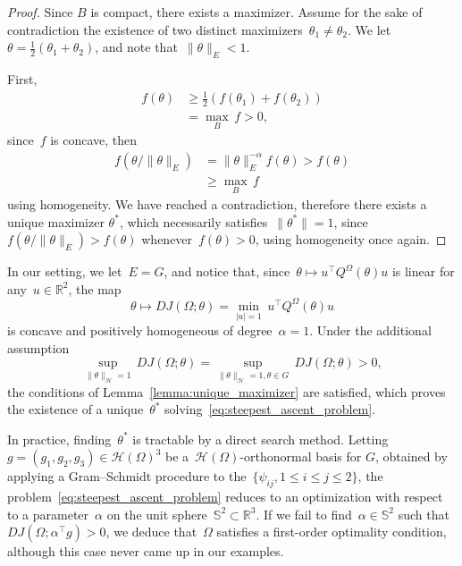 \documentclass[a4]{article}
\newcommand{\R}{\mathbb{R}}
\newcommand{\1}{\mathbbm 1}
\begin{document}
\begin{proof}
    Since $B$ is compact, there exists a maximizer. Assume for the sake of contradiction the existence of two distinct maximizers~$\theta_1\neq \theta_2$.
    We let~$\theta = \frac12(\theta_1+\theta_2)$, and note that~$\|\theta\|_E<1$.

    First,
    \begin{equation}
        \begin{aligned}
            f\left(\theta\right)&\geq \frac12\left(f(\theta_1)+f(\theta_2)\right)\\
            &=\max_B\,f>0,
        \end{aligned}
    \end{equation}
    since~$f$ is concave, then
    \begin{equation}
        \begin{aligned}
        f(\theta/\|\theta\|_{E})&=\|\theta\|^{-\alpha}_{E}f(\theta)>f(\theta)\\
        &\geq \max_B\,f
        \end{aligned}
    \end{equation}
    using homogeneity. We have reached a contradiction, therefore there exists a unique maximizer $\theta^*$, which necessarily satisfies~$\|\theta^*\|=1$, since~$f(\theta/\|\theta\|_E)>f(\theta)$ whenever~$f(\theta)>0$, using homogeneity once again.
\end{proof}

In our setting, we let~$E=G$, and notice that, since~$\theta\mapsto u^\top Q^\Omega(\theta)u$ is linear for any~$u\in \R^2$, the map
\begin{equation}
    \theta\mapsto DJ(\Omega;\theta)=\underset{|u|=1}{\min}\,u^\top Q^{\Omega}(\theta)u
\end{equation}
is concave and positively homogeneous of degree~$\alpha=1$. Under the additional assumption
$$\underset{\|\theta\|_{\mathcal H}=1}{\sup}\,DJ(\Omega;\theta)=\underset{\|\theta\|_{\mathcal H}=1,\theta\in G}{\sup}\,DJ(\Omega;\theta)>0,$$
 the conditions of Lemma~\ref{lemma:unique_maximizer} are satisfied, which proves the existence of a unique~$\theta^*$ solving~\eqref{eq:steepest_ascent_problem}.

In practice, finding~$\theta^*$ is tractable by a direct search method. Letting~$g=(g_1,g_2,g_3)\in \mathcal H(\Omega)^3$ be a~$\mathcal H(\Omega)$-orthonormal basis for $G$, obtained by applying a Gram--Schmidt procedure to the~$\{\psi_{ij},1\leq i\leq j\leq 2\}$, the problem~\eqref{eq:steepest_ascent_problem} reduces to an optimization with respect to a parameter~$\alpha$ on the unit sphere~$\mathbb S^2\subset\R^3$. 
If we fail to find~$\alpha\in\mathbb S^2$ such that~$DJ(\Omega;\alpha^\top g)>0$, we deduce that~$\Omega$ satisfies a first-order optimality condition, although this case never came up in our examples.
\end{document}
